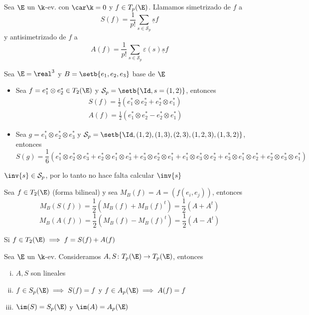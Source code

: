 \begin{defi}
    Sea $ \E $ un $ \k $-ev.  con $ \car \k = 0 $ y $ f \in T_p(\E) $.
    Llamamos simetrizado de $ f $ a
    \[
        S(f) = \frac{1}{p!}\sum_{s \in \mathcal{S}_p} \underline{s}f
    \]
    y antisimetrizado de $ f $ a
    \[
        A(f) = \frac{1}{p!}\sum_{s \in \mathcal{S}_p} \varepsilon(s)\underline
        {s}f
    \]
\end{defi}
\begin{example}
    Sea $ \E = \real^3 $ y $ B = \setb{e_1,e_2,e_3} $ base de $ \E $
    \begin{itemize}
        \item
            Sea $ f = e_1^* \otimes e_2^* \in T_2(\E) $ y $ \mathcal{S}_p=\setb
            {\Id,s=(1,2)} $, entonces
            \begin{gather*}
                S(f) = \frac{1}{2} (e_1^* \otimes e_2^* + e_2^* \otimes
                e_1^*) \\
                A(f) = \frac{1}{2} (e_1^* \otimes e_2^* - e_2^* \otimes
                e_1^*)
            \end{gather*}
        \item
            Sea $ g = e_1^* \otimes e_2^* \otimes e_3^* $ y $ \mathcal{S}_p
            = \setb{\Id,(1,2),(1,3),(2,3),(1,2,3),(1,3,2)} $, entonces
            \[
                S(g) = \frac{1}{6} (e_1^*\otimes e_2^*\otimes e_3^* + e_2^*\otimes
                e_1^*\otimes e_3^* + e_3^*\otimes e_2^*\otimes e_1^* + e_1^*\otimes
                e_3^*\otimes e_2^* + e_3^*\otimes e_1^*\otimes e_2^* + e_2^*\otimes
                e_3^*\otimes e_1^*)
            \]
    \end{itemize}
\end{example}
\begin{obs}
    $ \inv{s} \in \mathcal{S}_p $, por lo tanto no hace falta calcular $
    \inv{s} $
\end{obs}
\begin{example}
    Sea $ f \in T_2(\E) $ (forma bilineal) y sea $ M_B(f)=A= \left( f(e_i,e_j)
    \right) $, entonces
    \[
        M_B(S(f)) = \frac{1}{2}\left( M_B(f) + M_B(f)^t \right) = \frac{1}
        {2}(A + A^t)
    \]
    \[
        M_B(A(f)) = \frac{1}{2}\left( M_B(f) - M_B(f)^t \right) = \frac{1}
        {2}(A - A^t)
    \]
\end{example}
\begin{obs}
    Si $ f \in T_2(\E) \implies f = S(f) + A(f) $
\end{obs}
\begin{prop}
    Sea $ \E $ un $ \k $-ev.  Consideramos $ A,S \colon T_p(\E) \to T_p(\E)
    $, entonces
    \begin{enumerate}[i)]
    \item
        $ A,S $ son lineales
    \item
        \label{item:s_sp} $ f \in S_p(\E) \implies S(f) = f $ y $ f \in
        A_p(\E) \implies A(f) = f $
    \item
        $ \im(S)=S_p(\E) $ y $ \im(A)=A_p(\E) $
\end{enumerate}
\end{prop}
